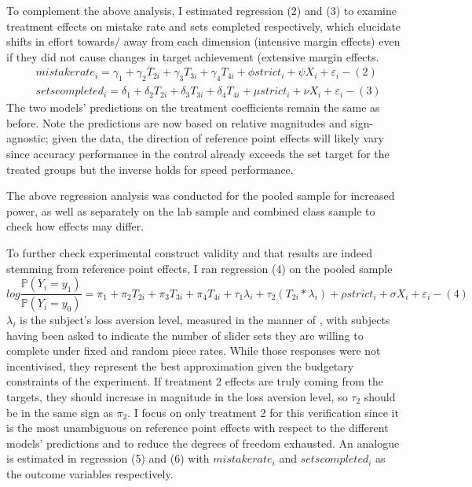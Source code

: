 \documentclass[12pt, letterpaper, DIV=11, numbers=noendperiod]{article}
\begin{document}
To complement the above analysis, I estimated regression (2) and (3) to examine treatment effects on mistake rate and sets completed respectively, which elucidate shifts in effort towards/ away from each dimension (intensive margin effects) even if they did not cause changes in target achievement (extensive margin effects.
\[
\begin{aligned}
& mistakerate_i = \gamma_1 + \gamma_2 T_{2i} + \gamma_3 T_{3i} + \gamma_4 T_{4i} + \phi strict_i + \psi X_i + \varepsilon_i -(2)
\\
& setscompleted_i = \delta_1 + \delta_2 T_{2i} + \delta_3 T_{3i} + \delta_4 T_{4i} + \mu strict_i + \nu X_i + \varepsilon_i -(3)
\end{aligned}
\]
The two models' predictions on the treatment coefficients remain the same as before. Note the predictions are now based on relative magnitudes and sign-agnostic; given the data, the direction of reference point effects will likely vary since accuracy performance in the control already exceeds the set target for the treated groups but the inverse holds for speed performance.

The above regression analysis was conducted for the pooled sample for increased power, as well as separately on the lab sample and combined class sample to check how effects may differ.

To further check experimental construct validity and that results are indeed stemming from reference point effects, I ran regression (4) on the pooled sample
\[
log \frac {\mathbb{P}(Y_i = y_1)}{\mathbb{P}(Y_i = y_0)} = \pi_1 + \pi_2 T_{2i} + \pi_3 T_{3i} + \pi_4 T_{4i} + \tau_1 \lambda_i + \tau_2(T_{2i}*\lambda_i) + \rho strict_i + \sigma X_i + \varepsilon_i -(4)
\]
\(\lambda_i\) is the subject's loss aversion level, measured in the manner of \textcite{campos-mercade.2024.gustibusdisputes}, with subjects having been asked to indicate the number of slider sets they are willing to complete under fixed and random piece rates. While those responses were not incentivised, they represent the best approximation given the budgetary constraints of the experiment. If treatment 2 effects are truly coming from the targets, they should increase in magnitude in the loss aversion level, so \(\tau_2\) should be in the same sign as \(\pi_2\). I focus on only treatment 2 for this verification since it is the most unambiguous on reference point effects with respect to the different models' predictions and to reduce the degrees of freedom exhausted. An analogue is estimated in regression (5) and (6) with \(mistakerate_i\) and \(setscompleted_i\) as the outcome variables respectively.
\end{document}
